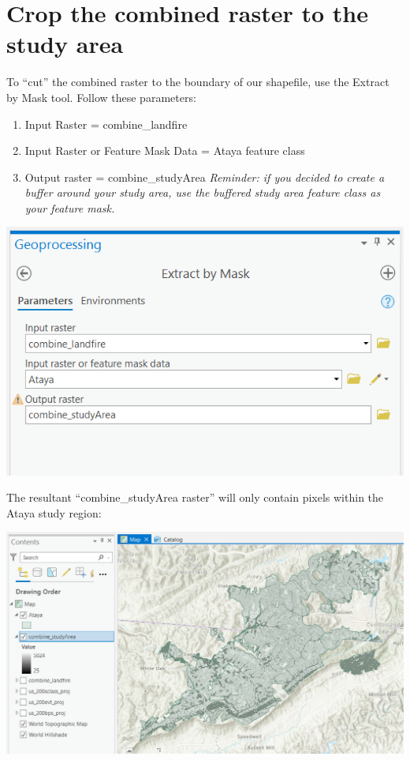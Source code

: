 \documentclass[
]{book}
\providecommand{\tightlist}{%
  \setlength{\itemsep}{0pt}\setlength{\parskip}{0pt}}
\begin{document}
\hypertarget{crop-the-combined-raster-to-the-study-area}{%
\section{Crop the combined raster to the study area}\label{crop-the-combined-raster-to-the-study-area}}

To ``cut'' the combined raster to the boundary of our shapefile, use the Extract by Mask tool. Follow these parameters:

\begin{enumerate}
\def\labelenumi{\arabic{enumi}.}
\tightlist
\item
  Input Raster = combine\_landfire
\item
  Input Raster or Feature Mask Data = Ataya feature class
\item
  Output raster = combine\_studyArea
  \emph{Reminder: if you decided to create a buffer around your study area, use the buffered study area feature class as your feature mask.}
\end{enumerate}

\includegraphics[width=1000pt]{04_gis_screenshots/11_extract}

The resultant ``combine\_studyArea raster'' will only contain pixels within the Ataya study region:

\includegraphics[width=1000pt]{04_gis_screenshots/12_combine_studyArea}
\end{document}
